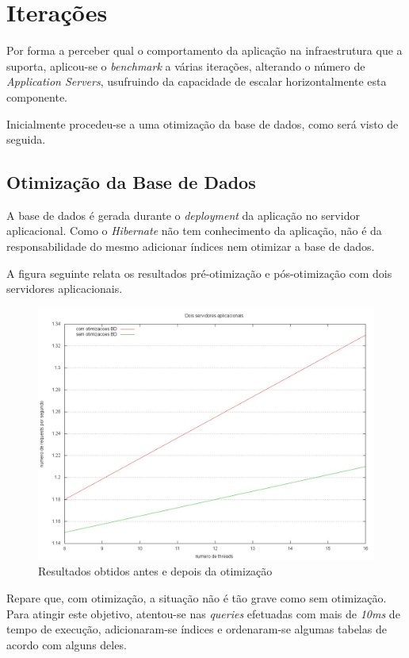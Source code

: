 \section{Iterações}

Por forma a perceber qual o comportamento da aplicação na infraestrutura que a suporta, aplicou-se o \emph{benchmark} a várias iterações, alterando o número de \emph{Application Servers}, usufruindo da capacidade de escalar horizontalmente esta componente.

Inicialmente procedeu-se a uma otimização da base de dados, como será visto de seguida.

\subsection{Otimização da Base de Dados}

A base de dados é gerada durante o \emph{deployment} da aplicação no servidor aplicacional. Como o \emph{Hibernate} não tem conhecimento da aplicação, não é da responsabilidade do mesmo adicionar índices nem otimizar a base de dados.

A figura seguinte relata os resultados pré-otimização e pós-otimização com dois servidores aplicacionais.

\begin{figure}[H]
\centerline{\includegraphics[width=1\textwidth]{images/benchmark/optimization}}
\label{fig:optimization}
\caption{Resultados obtidos antes e depois da otimização}
\end{figure}

Repare que, com otimização, a situação não é tão grave como sem otimização. Para atingir este objetivo, atentou-se nas \emph{queries} efetuadas com mais de \emph{10ms} de tempo de execução, adicionaram-se índices e ordenaram-se algumas tabelas de acordo com alguns deles.

